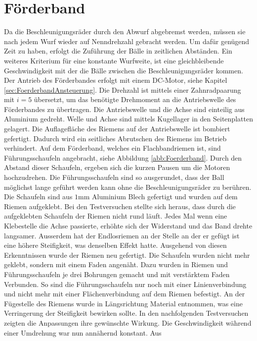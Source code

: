 \section{Förderband}
\label{sec:Foerderband}
	Da die Beschleunigungsräder durch den Abwurf abgebremst werden, müssen 
	sie nach jedem Wurf wieder auf Nenndrehzahl gebracht werden. Um dafür 
	genügend Zeit zu haben, erfolgt die Zuführung der Bälle in zeitlichen 
	Abständen. Ein weiteres Kriterium für eine konstante Wurfweite, ist eine 
	gleichbleibende Geschwindigkeit mit der die Bälle zwischen die 
	Beschleunigungsräder kommen. Der Antrieb des Förderbandes erfolgt mit 
	einem DC-Motor, siehe Kapitel \ref{sec:FoerderbandAnsteuerung}. Die 
	Drehzahl ist mittels einer Zahnradpaarung mit $i=5$ übersetzt, um das 
	benötigte Drehmoment an die Antriebswelle des Förderbandes zu übertragen. 
	Die Antriebswelle und die Achse sind einteilig aus Aluminium gedreht. 
	Welle und Achse sind mittels Kugellager in den Seitenplatten gelagert. 
	Die Auflagefläche des Riemens auf der Antriebswelle ist bombiert gefertigt. 
	Dadurch wird ein seitliches Abrutschen des Riemens im Betrieb verhindert. 
	Auf dem Förderband, welches ein Flachbandriemen ist, sind Führungsschaufeln 
	angebracht, siehe Abbildung \ref{abb:Foerderband}. Durch den Abstand dieser 
	Schaufeln, ergeben sich die kurzen 
	Pausen um die Motoren hochzudrehen. Die Führungsschaufeln sind so 
	ausgerundet, dass der Ball möglichst lange geführt werden kann ohne die 
	Beschleunigungsräder zu berühren. Die Schaufeln sind aus $1\si{\milli\meter}$ 
	Aluminium Blech gefertigt und wurden auf dem Riemen aufgeklebt. Bei den 
	Testversuchen stellte sich heraus, dass durch die aufgeklebten Schaufeln 
	der Riemen nicht rund läuft. Jedes Mal wenn eine Klebestelle die Achse 
	passierte, erhöhte sich der Widerstand und das Band drehte langsamer. 
	Ausserdem hat der Endlosriemen an der Stelle an der er gefügt ist eine 
	höhere Steifigkeit, was denselben Effekt hatte. Ausgehend von diesen 
	Erkenntnissen wurde der Riemen neu gefertigt. Die Schaufeln wurden nicht 
	mehr geklebt, sondern mit einem Faden angenäht. Dazu wurden in Riemen 
	und Führungsschaufeln je drei Bohrungen gemacht und mit verstärktem Faden 
	Verbunden. So sind die Führungsschaufeln nur noch mit einer Linienverbindung 
	und nicht mehr mit einer Flächenverbindung auf dem Riemen befestigt. An 
	der Fügestelle des Riemens wurde in Längsrichtung Material entnommen, was 
	eine Verringerung der Steifigkeit bewirken sollte. In den nachfolgenden 
	Testversuchen zeigten die Anpassungen ihre gewünschte Wirkung. Die 
	Geschwindigkeit während einer Umdrehung war nun annähernd konstant. Aus 

